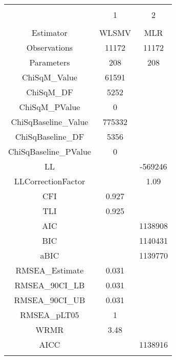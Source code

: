 
\begin{table}[!htbp] \centering 
  \caption{} 
  \label{} 
\begin{tabular}{@{\extracolsep{5pt}} ccc} 
\\[-1.8ex]\hline 
\hline \\[-1.8ex] 
 & 1 & 2 \\ 
\hline \\[-1.8ex] 
Estimator & WLSMV & MLR \\ 
Observations & 11172 & 11172 \\ 
Parameters & 208 & 208 \\ 
ChiSqM\_Value & 61591 &  \\ 
ChiSqM\_DF & 5252 &  \\ 
ChiSqM\_PValue &  0 &  \\ 
ChiSqBaseline\_Value & 775332 &  \\ 
ChiSqBaseline\_DF & 5356 &  \\ 
ChiSqBaseline\_PValue &  0 &  \\ 
LL &  & -569246 \\ 
LLCorrectionFactor &  & 1.09 \\ 
CFI & 0.927 &  \\ 
TLI & 0.925 &  \\ 
AIC &  & 1138908 \\ 
BIC &  & 1140431 \\ 
aBIC &  & 1139770 \\ 
RMSEA\_Estimate & 0.031 &  \\ 
RMSEA\_90CI\_LB & 0.031 &  \\ 
RMSEA\_90CI\_UB & 0.031 &  \\ 
RMSEA\_pLT05 &  1 &  \\ 
WRMR & 3.48 &  \\ 
AICC &  & 1138916 \\ 
\hline \\[-1.8ex] 
\end{tabular} 
\end{table} 
